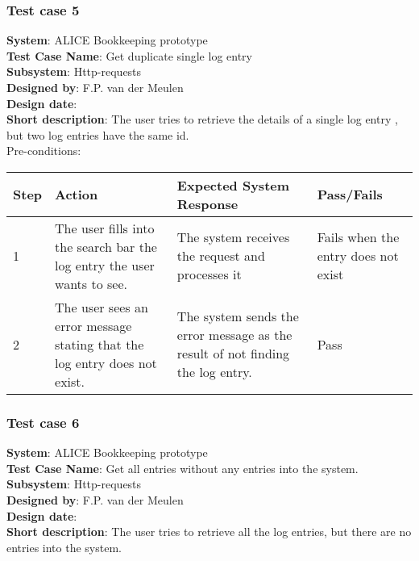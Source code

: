 \subsubsection{Test case 5}
\textbf{System}:  ALICE Bookkeeping prototype \\
\textbf{Test Case Name}:  Get duplicate single log entry \\
\textbf{Subsystem}:  Http-requests \\
\textbf{Designed by}:  F.P. van der Meulen\\
\textbf{Design date}:  \\
\textbf{Short description}: The user tries to retrieve the details of a single log entry , but two log entries have the same id. \\

Pre-conditions: \\

\begin{longtable}{ | p{0.8cm} | p{4.5cm} | p{6cm} | p{1.5cm} |}
\hline
Step & Action & Expected System Response & Pass/Fails  \\ \hline
1 & The user fills into the search bar the log entry the user wants to see. & The system receives the request and processes it & Fails when the entry does not exist  \\ \hline
2 & The user sees an error message stating that the log entry does not exist. & The system sends the error message as the result of not finding the log entry. & Pass \\ \hline

\end{longtable}
\subsubsection{Test case 6}
\textbf{System}:  ALICE Bookkeeping prototype \\
\textbf{Test Case Name}:  Get all entries without any entries into the system. \\
\textbf{Subsystem}:  Http-requests \\
\textbf{Designed by}:  F.P. van der Meulen\\
\textbf{Design date}:  \\
\textbf{Short description}: The user tries to retrieve all the log entries, but there are no entries into the system. \\

